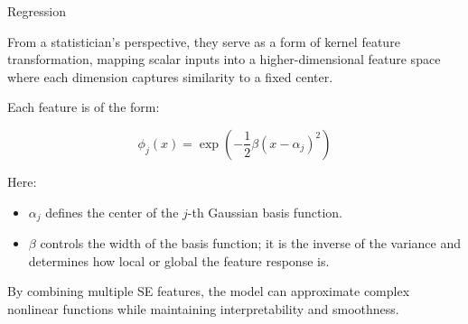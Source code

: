 \documentclass[
	english,
        solution=true
	]{tudaexercise}
\begin{document}
\begin{task}[points=34]{Regression}
\begin{subtask}[points=8, title=Squared Exponential Features]
\begin{solution}
            From a statistician’s perspective, they serve as a form of kernel feature transformation, mapping scalar inputs into a higher-dimensional feature space where each dimension captures similarity to a fixed center.

            Each feature is of the form:

            \[
            \phi_j(x) = \exp\left(-\frac{1}{2} \beta (x - \alpha_j)^2\right)
            \]

            Here:
            \begin{itemize}
                \item $\alpha_j$ defines the center of the $j$-th Gaussian basis function.
                \item $\beta$ controls the width of the basis function; it is the inverse of the variance and determines how local or global the feature response is.
            \end{itemize}

            By combining multiple SE features, the model can approximate complex nonlinear functions while maintaining interpretability and smoothness.

        \end{solution}
    \end{subtask}
\end{task}

\newpage
\end{document}

